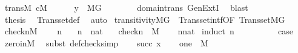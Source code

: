\begin{isabellebody}
\ trans{\isacharunderscore}{\kern0pt}M\ {\isacartoucheopen}c{\isasymin}M{\isacartoucheclose}\isanewline
\ \ \ \ \isamarkupfalse%
\ {\isachardoublequoteopen}y\ {\isasymin}\ M{\isacharbrackleft}{\kern0pt}G{\isacharbrackright}{\kern0pt}{\isachardoublequoteclose}\isanewline
\ \ \ \ \ \ \isamarkupfalse%
\ domain{\isacharunderscore}{\kern0pt}trans\ GenExtI\ \isamarkupfalse%
\ blast\isanewline
\ \ \isacommand{{\isacharbraceright}{\kern0pt}}\isamarkupfalse%
\isanewline
\ \ \isamarkupfalse%
\isanewline
\ \ \isamarkupfalse%
\ {\isacharquery}{\kern0pt}thesis\ \isamarkupfalse%
\ Transset{\isacharunderscore}{\kern0pt}def\ \isamarkupfalse%
\ auto\isanewline
{}\isamarkupfalse%
%
\endisatagproof
{\isafoldproof}%
%
\isadelimproof
\isanewline
%
\endisadelimproof
\isanewline
{}\isamarkupfalse%
\ transitivity{\isacharunderscore}{\kern0pt}MG\ {\isacharequal}{\kern0pt}\ Transset{\isacharunderscore}{\kern0pt}intf{\isacharbrackleft}{\kern0pt}OF\ Transset{\isacharunderscore}{\kern0pt}MG{\isacharbrackright}{\kern0pt}\isanewline
\isanewline
{}\isamarkupfalse%
\ check{\isacharunderscore}{\kern0pt}n{\isacharunderscore}{\kern0pt}M\ {\isacharcolon}{\kern0pt}\isanewline
\ \ \ n\isanewline
\ \ \ {\isachardoublequoteopen}n\ {\isasymin}\ nat{\isachardoublequoteclose}\isanewline
\ \ \ {\isachardoublequoteopen}check{\isacharparenleft}{\kern0pt}n{\isacharparenright}{\kern0pt}\ {\isasymin}\ M{\isachardoublequoteclose}\isanewline
%
\isadelimproof
\ \ %
\endisadelimproof
%
\isatagproof
{}\isamarkupfalse%
\ {\isacartoucheopen}n{\isasymin}nat{\isacartoucheclose}\isanewline
{}\isamarkupfalse%
\ {\isacharparenleft}{\kern0pt}induct\ n{\isacharparenright}{\kern0pt}\isanewline
\ \ \isamarkupfalse%
\ {}\isanewline
\ \ \isamarkupfalse%
\ \isamarkupfalse%
\ {\isacharquery}{\kern0pt}case\ \isamarkupfalse%
\ zero{\isacharunderscore}{\kern0pt}in{\isacharunderscore}{\kern0pt}M\ \isamarkupfalse%
\ {\isacharparenleft}{\kern0pt}subst\ def{\isacharunderscore}{\kern0pt}check{\isacharcomma}{\kern0pt}simp{\isacharparenright}{\kern0pt}\isanewline
{}\isamarkupfalse%
\isanewline
\ \ \isamarkupfalse%
\ {\isacharparenleft}{\kern0pt}succ\ x{\isacharparenright}{\kern0pt}\isanewline
\ \ \isamarkupfalse%
\ {\isachardoublequoteopen}one\ {\isasymin}\ M{\isachardoublequoteclose}\ \isamarkupfalse%

\end{isabellebody}
